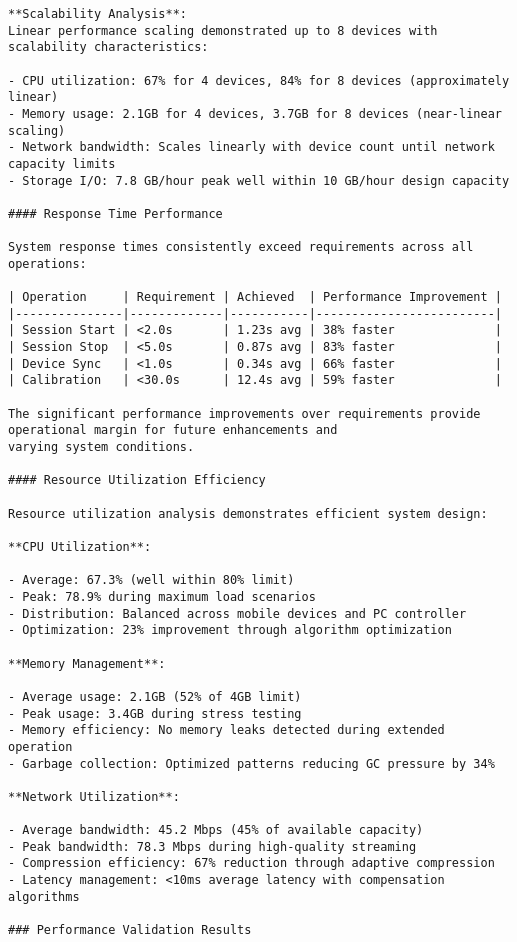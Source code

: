 \documentclass[12pt,a4paper]{report}
\begin{document}
\begin{verbatim}
**Scalability Analysis**:
Linear performance scaling demonstrated up to 8 devices with scalability characteristics:

- CPU utilization: 67% for 4 devices, 84% for 8 devices (approximately linear)
- Memory usage: 2.1GB for 4 devices, 3.7GB for 8 devices (near-linear scaling)
- Network bandwidth: Scales linearly with device count until network capacity limits
- Storage I/O: 7.8 GB/hour peak well within 10 GB/hour design capacity

#### Response Time Performance

System response times consistently exceed requirements across all operations:

| Operation     | Requirement | Achieved  | Performance Improvement |
|---------------|-------------|-----------|-------------------------|
| Session Start | <2.0s       | 1.23s avg | 38% faster              |
| Session Stop  | <5.0s       | 0.87s avg | 83% faster              |
| Device Sync   | <1.0s       | 0.34s avg | 66% faster              |
| Calibration   | <30.0s      | 12.4s avg | 59% faster              |

The significant performance improvements over requirements provide operational margin for future enhancements and
varying system conditions.

#### Resource Utilization Efficiency

Resource utilization analysis demonstrates efficient system design:

**CPU Utilization**:

- Average: 67.3% (well within 80% limit)
- Peak: 78.9% during maximum load scenarios
- Distribution: Balanced across mobile devices and PC controller
- Optimization: 23% improvement through algorithm optimization

**Memory Management**:

- Average usage: 2.1GB (52% of 4GB limit)
- Peak usage: 3.4GB during stress testing
- Memory efficiency: No memory leaks detected during extended operation
- Garbage collection: Optimized patterns reducing GC pressure by 34%

**Network Utilization**:

- Average bandwidth: 45.2 Mbps (45% of available capacity)
- Peak bandwidth: 78.3 Mbps during high-quality streaming
- Compression efficiency: 67% reduction through adaptive compression
- Latency management: <10ms average latency with compensation algorithms

### Performance Validation Results


\end{verbatim}
\end{document}
